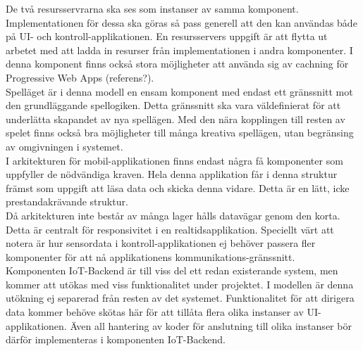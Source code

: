 De två resursservrarna ska ses som instanser av samma komponent. Implementationen för dessa ska göras så pass generell att den kan användas både på UI- och kontroll-applikationen. En resursservers uppgift är att flytta ut arbetet med att ladda in resurser från implementationen i andra komponenter. I denna komponent finns också stora möjligheter att använda sig av cachning för Progressive Web Apps (referens?).\\

Spelläget är i denna modell en ensam komponent med endast ett gränssnitt mot den grundläggande spellogiken. Detta gränssnitt ska vara väldefinierat för att underlätta skapandet av nya spellägen. Med den nära kopplingen till resten av spelet finns också bra möjligheter till många kreativa spellägen, utan begränsing av omgivningen i systemet.\\

I arkitekturen för mobil-applikationen finns endast några få komponenter som uppfyller de nödvändiga kraven. Hela denna applikation får i denna struktur främst som uppgift att läsa data och skicka denna vidare. Detta är en lätt, icke prestandakrävande struktur.\\

Då arkitekturen inte består av många lager hålls datavägar genom den korta. Detta är centralt för responsivitet i en realtidsapplikation. Speciellt värt att notera är hur sensordata i kontroll-applikationen ej behöver passera fler komponenter för att nå applikationens kommunikations-gränssnitt.\\

Komponenten IoT-Backend är till viss del ett redan existerande system, men kommer att utökas med viss funktionalitet under projektet. I modellen är denna utökning ej separerad från resten av det systemet. Funktionalitet för att dirigera data kommer behöve skötas här för att tillåta flera olika instanser av UI-applikationen. Även all hantering av koder för anslutning till olika instanser bör därför implementeras i komponenten IoT-Backend.\\
